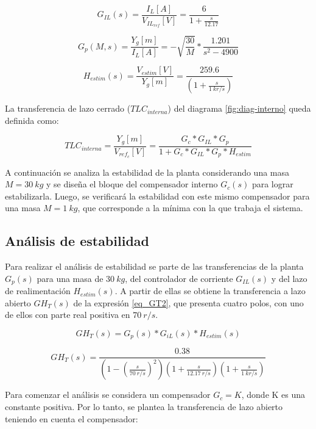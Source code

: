 \begin{equation*}
	G_{IL}(s) =\frac{I_L[A]}{V_{IL_{ref}}[V]}=\frac{6}{1+\frac{s}{12.17}}
\end{equation*}

\begin{equation*} 
	G_{p}(M,s)=\frac{Y_g[m]}{I_L[A]}=-\sqrt{\frac{30}{M}}*\frac{1.201}{s^{2}-4900}
\end{equation*}

\begin{equation*} 
	H_{estim}(s)=\frac{V_{estim}[V]}{Y_{g}[m]}=\frac{259.6}{(1+\frac{s}{1\:kr/s})}
\end{equation*}

La transferencia de lazo cerrado ($TLC_{interna}$) del diagrama \ref{fig:diag-interno} queda definida como:

\begin{equation}
	TLC_{interna}=\frac{Y_g[m]}{V_{ref_c}[V]}=\frac{G_c*G_{IL}*G_p}{1+G_c*G_{IL}*G_p*H_{estim}}
\end{equation}

A continuación se analiza la estabilidad de la planta considerando una masa $M=30\:kg$ y se diseña el bloque del compensador interno $G_c(s)$ para lograr estabilizarla. Luego, se verificará la estabilidad con este mismo compensador para una masa $M=1\:kg$, que corresponde a la mínima con la que trabaja el sistema.

\subsection{Análisis de estabilidad}

Para realizar el análisis de estabilidad se parte de las transferencias de la planta $G_{p}(s)$ para una masa de $30\:kg$, del controlador de corriente $G_{IL}(s)$ y del lazo de realimentación $H_{estim}(s)$. A partir de ellas se obtiene la transferencia a lazo abierto $GH_T(s)$ de la expresión \ref{eq_GT2}, que presenta cuatro polos, con uno de ellos con parte real positiva en $70\:r/s$.

\begin{equation*}
	GH_T(s)=G_{p}(s)*G_{iL}(s)*H_{estim}(s) 
\end{equation*}

\begin{equation} \label{eq_GT2}
		GH_T(s)=\frac{0.38}{(1-(\frac{s}{70\:r/s})^2)(1+\frac{s}{12.17\:r/s })(1+\frac{s}{1\:kr/s}) }	
\end{equation}


Para comenzar el análisis se considera un compensador $G_c=K$, donde K es una constante positiva. Por lo tanto, se plantea la transferencia de lazo abierto teniendo en cuenta el compensador:

